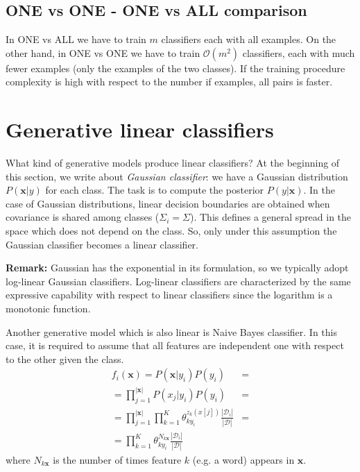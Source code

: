 \subsection{ONE vs ONE - ONE vs ALL comparison}
In ONE vs ALL we have to train $m$ classifiers each with all examples. On the other hand, in ONE vs ONE we have to train $\mathcal{O}(m^2)$ classifiers, each with much fewer examples (only the examples of the two classes). If the training procedure complexity is high with respect to the number if examples, all pairs is faster.

\section{Generative linear classifiers}
What kind of generative models produce linear classifiers? At the beginning of this section, we write about \textit{Gaussian classifier}: we have a Gaussian distribution $P(\pmb{x}|y)$ for each class. The task is to compute the posterior $P(y | \pmb{x})$. In the case of Gaussian distributions, linear decision boundaries are obtained when covariance is shared among classes ($\Sigma_i = \Sigma$). This defines a general spread in the space which does not depend on the class. So, only under this assumption the Gaussian classifier becomes a linear classifier. \newline

\textbf{Remark:} Gaussian has the exponential in its formulation, so we typically adopt log-linear Gaussian classifiers. Log-linear classifiers are characterized by the same expressive capability with respect to linear classifiers since the logarithm is a monotonic function. \newline

Another generative model which is also linear is Naive Bayes classifier. In this case, it is required to assume that all features are independent one with respect to the other given the class.
\begin{align*}
    f_i(\pmb{x}) = P(\pmb{x} | y_i) P(y_i) &= \\
    = \prod_{j=1}^{|\pmb{x}|} P(x_j | y_i) P(y_i) &= \\
    = \prod_{j=1}^{|\pmb{x}|} \prod_{k=1}^{K} \theta_{ky_i}^{z_k(x[j])} \frac{|\mathcal{D}_i|}{|\mathcal{D}|} &= \\
    = \prod_{k=1}^{K} \theta_{ky_i}^{N_{k\pmb{x}}} \frac{|\mathcal{D}_i|}{|\mathcal{D}|}
\end{align*}
where $N_{k\pmb{x}}$ is the number of times feature $k$ (e.g. a word) appears in $\pmb{x}$. \newline

